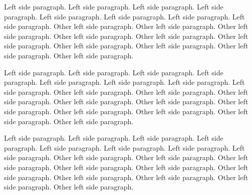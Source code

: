 \documentclass[a5paper,11pt]{article}
\begin{document}
\begin{pages}
\begin{Leftside}
                        \pstart
                Left side paragraph. Left side paragraph. Left side paragraph. Left side paragraph. Left side paragraph. Left side paragraph. Left side paragraph. Left side paragraph.
            \pend
            \pstart
                Other left side paragraph.  Other left side paragraph.  Other left side paragraph.  Other left side paragraph.  Other left side paragraph.  Other left side paragraph.  Other left side paragraph.  Other left side paragraph.  Other left side paragraph.  Other left side paragraph.
            \pend


                        \pstart
                Left side paragraph. Left side paragraph. Left side paragraph. Left side paragraph. Left side paragraph. Left side paragraph. Left side paragraph. Left side paragraph.
            \pend
            \pstart
                Other left side paragraph.  Other left side paragraph.  Other left side paragraph.  Other left side paragraph.  Other left side paragraph.  Other left side paragraph.  Other left side paragraph.  Other left side paragraph.  Other left side paragraph.  Other left side paragraph.
            \pend

                        \pstart
                Left side paragraph. Left side paragraph. Left side paragraph. Left side paragraph. Left side paragraph. Left side paragraph. Left side paragraph. Left side paragraph.
            \pend
            \pstart
                Other left side paragraph.  Other left side paragraph.  Other left side paragraph.  Other left side paragraph.  Other left side paragraph.  Other left side paragraph.  Other left side paragraph.  Other left side paragraph.  Other left side paragraph.  Other left side paragraph.
            \pend



\end{Leftside}
\end{pages}
\end{document}
